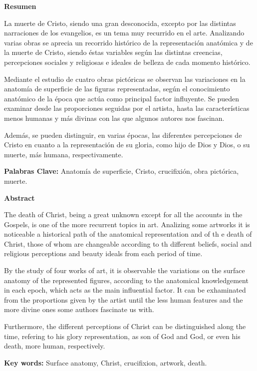 \textbf{Resumen}

La muerte de Cristo, siendo una gran desconocida, excepto por las distintas narraciones de los evangelios, es un tema muy recurrido en el arte. Analizando varias obras se aprecia un recorrido histórico de la representación anatómica y de la muerte de Cristo, siendo éstas variables según las distintas creencias, percepciones sociales y religiosas e ideales de belleza de cada momento histórico.

Mediante el estudio de cuatro obras pictóricas se observan las variaciones en la anatomía de superficie de las figuras representadas, según el conocimiento anatómico de la época que actúa como principal factor influyente. Se pueden examinar desde las proporciones seguidas por el artista, hasta las características menos humanas y más divinas con las que algunos autores nos fascinan.

Además, se pueden distinguir, en varias épocas, las diferentes percepciones de Cristo en cuanto a la representación de su gloria, como hijo de Dios y Dios, o su muerte, más humana, respectivamente.

\vspace{15pt}

\textbf{Palabras Clave:}
Anatomía de superficie, Cristo, crucifixión, obra pictórica, muerte.

\vspace{30pt}

\textbf{Abstract}

The death of Christ, being a great unknown except for all the accounts in the Gospels, is one of the more recurrent topics in art. Analizing some artworks it is noticeable a historical path of the anatomical representation and of th e death of Christ, those of whom are changeable according to th different beliefs, social and religious perceptions and beauty ideals from each period of time.

By the study of four works of art, it is observable the variations on the surface anatomy of the represented figures, according to the anatomical knowledgement in each epoch, which acts as the main influential factor. It can be exhaminated from the proportions given by the artist until the less human features and the more divine ones some authors fascinate us with.

Furthermore, the different perceptions of Christ can be distinguished  along the time, refering to his glory representation, as son of God and God, or even his death, more human, respectively.

\vspace{15pt}

\textbf{Key words:}
Surface anatomy, Christ, crucifixion, artwork, death.